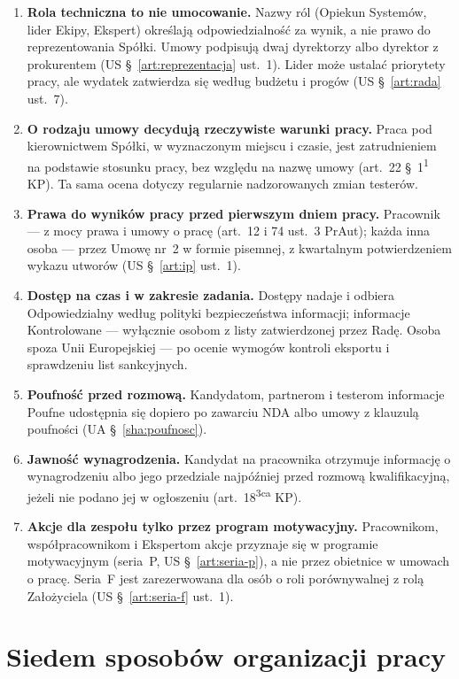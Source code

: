 \documentclass[11pt,a4paper]{report}
\newcommand{\US}[1]{US §~#1}
\newcommand{\UA}[1]{UA §~#1}
\begin{document}
\begin{enumerate}
  \item \textbf{Rola techniczna to nie umocowanie.} Nazwy ról (Opiekun Systemów, lider Ekipy, Ekspert) określają odpowiedzialność za wynik, a nie prawo do reprezentowania Spółki. Umowy podpisują dwaj dyrektorzy albo dyrektor z prokurentem (\US{\ref{art:reprezentacja} ust.~1}). Lider może ustalać priorytety pracy, ale wydatek zatwierdza się według budżetu i progów (\US{\ref{art:rada} ust.~7}).
  \item \textbf{O rodzaju umowy decydują rzeczywiste warunki pracy.} Praca pod kierownictwem Spółki, w wyznaczonym miejscu i czasie, jest zatrudnieniem na podstawie stosunku pracy, bez względu na nazwę umowy (art.~22 §~1\textsuperscript{1} KP). Ta sama ocena dotyczy regularnie nadzorowanych zmian testerów.
  \item \textbf{Prawa do wyników pracy przed pierwszym dniem pracy.} Pracownik --- z mocy prawa i umowy o pracę (art.~12 i 74 ust.~3 PrAut); każda inna osoba --- przez Umowę nr~2 w formie pisemnej, z kwartalnym potwierdzeniem wykazu utworów (\US{\ref{art:ip} ust.~1}).
  \item \textbf{Dostęp na czas i w zakresie zadania.} Dostępy nadaje i odbiera Odpowiedzialny według polityki bezpieczeństwa informacji; informacje Kontrolowane --- wyłącznie osobom z listy zatwierdzonej przez Radę. Osoba spoza Unii Europejskiej --- po ocenie wymogów kontroli eksportu i sprawdzeniu list sankcyjnych.
  \item \textbf{Poufność przed rozmową.} Kandydatom, partnerom i testerom informacje Poufne udostępnia się dopiero po zawarciu NDA albo umowy z klauzulą poufności (\UA{\ref{sha:poufnosc}}).
  \item \textbf{Jawność wynagrodzenia.} Kandydat na pracownika otrzymuje informację o wynagrodzeniu albo jego przedziale najpóźniej przed rozmową kwalifikacyjną, jeżeli nie podano jej w ogłoszeniu (art.~18\textsuperscript{3ca} KP).
  \item \textbf{Akcje dla zespołu tylko przez program motywacyjny.} Pracownikom, współpracownikom i Ekspertom akcje przyznaje się w programie motywacyjnym (seria~P, \US{\ref{art:seria-p}}), a nie przez obietnice w umowach o pracę. Seria~F jest zarezerwowana dla osób o roli porównywalnej z rolą Założyciela (\US{\ref{art:seria-f} ust.~1}).
\end{enumerate}

\section{Siedem sposobów organizacji pracy}
\end{document}
